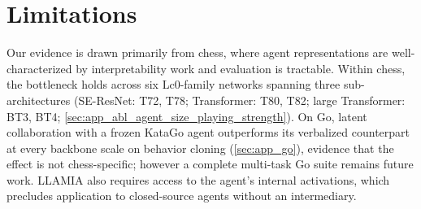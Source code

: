 \section*{Limitations}
\label{sec:limitations}
Our evidence is drawn primarily from chess, where agent representations are well-characterized by interpretability work and evaluation is tractable. Within chess, the bottleneck holds across six Lc0-family networks spanning three sub-architectures (SE-ResNet: T72, T78; Transformer: T80, T82; large Transformer: BT3, BT4; \cref{sec:app_abl_agent_size_playing_strength}). On Go, latent collaboration with a frozen KataGo agent outperforms its verbalized counterpart at every backbone scale on behavior cloning (\cref{sec:app_go}), evidence that the effect is not chess-specific; however a complete multi-task Go suite remains future work. LLAMIA also requires access to the agent's internal activations, which precludes application to closed-source agents without an intermediary.